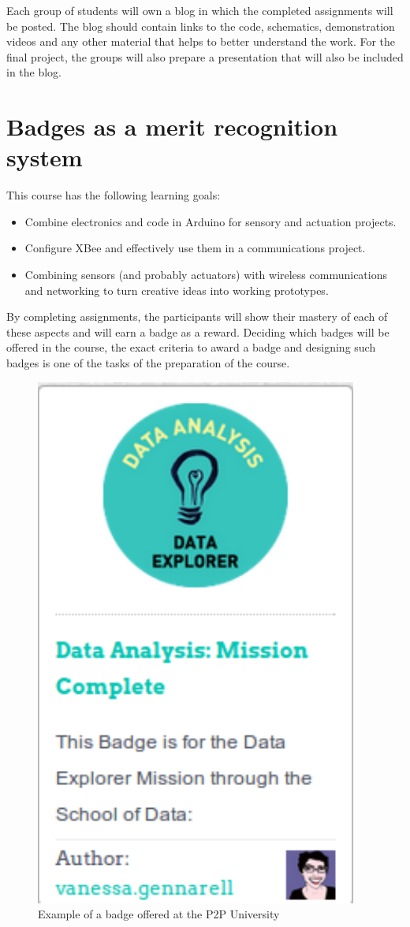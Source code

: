 \documentclass[oneside]{book}   %
\begin{document}
Each group of students will own a blog in which the completed assignments will be posted.
The blog should contain links to the code, schematics, demonstration videos and any other material that helps to better understand the work.
For the final project, the groups will also prepare a presentation that will also be included in the blog.

\section{Badges as a merit recognition system}

This course has the following learning goals:
\begin{itemize}
\item Combine electronics and code in Arduino for sensory and actuation projects.
\item Configure XBee and effectively use them in a communications project.
\item Combining sensors (and probably actuators) with wireless communications and networking to turn creative ideas into working prototypes.
\end{itemize}

By completing assignments, the participants will show their mastery of each of these aspects and will earn a badge as a reward.
Deciding which badges will be offered in the course, the exact criteria to award a badge and designing such badges is one of the tasks of the preparation of the course.

\begin{figure}
\begin{center}
\includegraphics[width=0.40\linewidth]{badge}
\caption{Example of a badge offered at the P2P University}
\label{fig:badge}
\end{center}
\end{figure}
\end{document}

